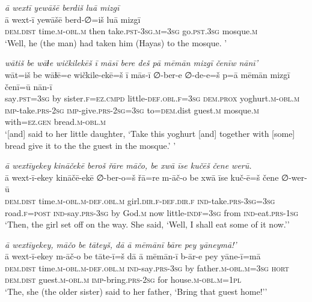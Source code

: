 \ea \label{ŽH.35}
\textit{ā wextī yewāšē berdiš luā mizgī} \\ 
\gll ā wext-ī yewāšē berd-∅=iš luā mizgī \\ 
 \textsc{dem.dist} time\textsc{.m}\textsc{-obl}\textsc{.m} then take\textsc{.pst}\textsc{-3sg}\textsc{.m}\textsc{=3sg} go\textsc{.pst}\textsc{.3sg} mosque\textsc{.m} \\ 
\glt `Well, he (the man) had taken him (Hayas) to the mosque. '
\z 
 
\ea \label{ŽH.40}
\textit{wātiš be wāɫe wičkilekēš ī māsī bere deš pā mēmān mizgī čenīw nānī’} \\ 
\gll wāt=iš be wāɫē=e wičkile-ekē=š ī mās-ī ∅-ber-e ∅-de-e=š p=ā mēmān mizgī čenī=ū nān-ī \\ 
 say\textsc{.pst}\textsc{=3sg} by sister\textsc{\textsc{.f}}\textsc{=ez}\textsc{.cmpd} little\textsc{-def}\textsc{.obl}\textsc{\textsc{.f}}\textsc{=3sg} \textsc{dem.prox} yoghurt\textsc{.m}\textsc{-obl}\textsc{.m} \textsc{imp-}take\textsc{.prs}-\textsc{2sg} \textsc{imp-}give\textsc{.prs}-\textsc{2sg}\textsc{=3sg} to\textsc{=dem}.dist guest\textsc{.m} mosque\textsc{.m} with\textsc{=ez}\textsc{.gen} bread\textsc{.m}\textsc{-obl}\textsc{.m} \\ 
\glt `[and] said to her little daughter, ‘Take this yoghurt [and] together with [some] bread give it to the the guest in the mosque.’ '
\z 
 
\ea \label{ŽH.41}
\textit{ā wextīyekey kināčekē beroš řāre māčo, be xwā īse kučēš čene werū.} \\ 
\gll ā wext-ī-ekey kināčē-ekē ∅-ber-o=š řā=re m-āč-o be xwā īse kuč-ē=š čene ∅-wer-ū \\ 
 \textsc{dem.dist} time\textsc{.m}\textsc{-obl}\textsc{.m}\textsc{-def}\textsc{.obl}\textsc{.m} girl\textsc{.dir}\textsc{\textsc{.f}}\textsc{-def}\textsc{.dir}\textsc{\textsc{.f}} \textsc{ind-}take\textsc{.prs}\textsc{-3sg}\textsc{=3sg} road\textsc{\textsc{.f}}\textsc{=\textsc{post}} \textsc{ind-}say\textsc{.prs}\textsc{-3sg} by God\textsc{.m} now little\textsc{-indf}\textsc{=3sg} from \textsc{ind-}eat\textsc{.prs}\textsc{-1sg} \\ 
\glt `Then, the girl set off on the way. She said, ‘Well, I shall eat some of it now.’'
\z 
 
\ea \label{ŽH.50}
\textit{ā wextīyekey, māčo be tāteyš, dā ā mēmānī bāre pey yāneymā!’} \\ 
\gll ā wext-ī-ekey m-āč-o be tāte-ī=š dā ā mēmān-ī b-ār-e pey yāne-ī=mā \\ 
 \textsc{dem.dist} time\textsc{.m}\textsc{-obl}\textsc{.m}\textsc{-def}\textsc{.obl}\textsc{.m} \textsc{ind-}say\textsc{.prs}\textsc{-3sg} by father\textsc{.m}\textsc{-obl}\textsc{.m}\textsc{=3sg} \textsc{hort} \textsc{dem.dist} guest\textsc{.m}\textsc{-obl}\textsc{.m} \textsc{imp-}bring\textsc{.prs}-\textsc{2sg} for house\textsc{.m}\textsc{-obl}\textsc{.m}\textsc{=1pl} \\ 
\glt `The, she (the older sister) said to her father, ‘Bring that guest home!’'
\z 
 
